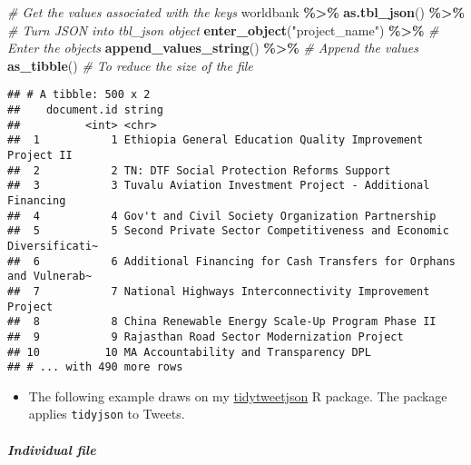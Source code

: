 \documentclass[
]{book}
\newenvironment{Shaded}{\begin{snugshade}}{\end{snugshade}}
\newcommand{\CommentTok}[1]{\textcolor[rgb]{0.56,0.35,0.01}{\textit{#1}}}
\newcommand{\KeywordTok}[1]{\textcolor[rgb]{0.13,0.29,0.53}{\textbf{#1}}}
\newcommand{\NormalTok}[1]{#1}
\newcommand{\OperatorTok}[1]{\textcolor[rgb]{0.81,0.36,0.00}{\textbf{#1}}}
\newcommand{\StringTok}[1]{\textcolor[rgb]{0.31,0.60,0.02}{#1}}
\providecommand{\tightlist}{%
  \setlength{\itemsep}{0pt}\setlength{\parskip}{0pt}}
\begin{document}
\begin{Shaded}
\begin{Highlighting}[]
\CommentTok{\# Get the values associated with the keys }
\NormalTok{worldbank }\OperatorTok{\%\textgreater{}\%}\StringTok{ }
\StringTok{  }\KeywordTok{as.tbl\_json}\NormalTok{() }\OperatorTok{\%\textgreater{}\%}\StringTok{ }\CommentTok{\# Turn JSON into tbl\_json object }
\StringTok{  }\KeywordTok{enter\_object}\NormalTok{(}\StringTok{"project\_name"}\NormalTok{) }\OperatorTok{\%\textgreater{}\%}\StringTok{ }\CommentTok{\# Enter the objects }
\StringTok{  }\KeywordTok{append\_values\_string}\NormalTok{() }\OperatorTok{\%\textgreater{}\%}\StringTok{ }\CommentTok{\# Append the values }
\StringTok{  }\KeywordTok{as\_tibble}\NormalTok{() }\CommentTok{\# To reduce the size of the file }
\end{Highlighting}
\end{Shaded}

\begin{verbatim}
## # A tibble: 500 x 2
##    document.id string                                                           
##          <int> <chr>                                                            
##  1           1 Ethiopia General Education Quality Improvement Project II        
##  2           2 TN: DTF Social Protection Reforms Support                        
##  3           3 Tuvalu Aviation Investment Project - Additional Financing        
##  4           4 Gov't and Civil Society Organization Partnership                 
##  5           5 Second Private Sector Competitiveness and Economic Diversificati~
##  6           6 Additional Financing for Cash Transfers for Orphans and Vulnerab~
##  7           7 National Highways Interconnectivity Improvement Project          
##  8           8 China Renewable Energy Scale-Up Program Phase II                 
##  9           9 Rajasthan Road Sector Modernization Project                      
## 10          10 MA Accountability and Transparency DPL                           
## # ... with 490 more rows
\end{verbatim}

\begin{itemize}
\tightlist
\item
  The following example draws on my \href{https://github.com/jaeyk/tidytweetjson}{tidytweetjson} R package. The package applies \texttt{tidyjson} to Tweets.
\end{itemize}

\hypertarget{individual-file}{%
\subparagraph{Individual file}\label{individual-file}}
\end{document}
